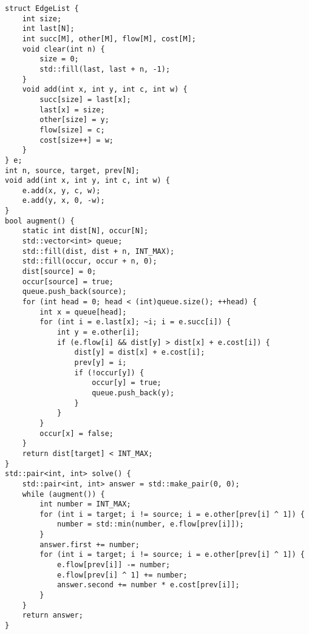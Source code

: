 \begin{lstlisting}
struct EdgeList {
    int size;
    int last[N];
    int succ[M], other[M], flow[M], cost[M];
    void clear(int n) {
        size = 0;
        std::fill(last, last + n, -1);
    }
    void add(int x, int y, int c, int w) {
        succ[size] = last[x];
        last[x] = size;
        other[size] = y;
        flow[size] = c;
        cost[size++] = w;
    }
} e;
int n, source, target, prev[N];
void add(int x, int y, int c, int w) {
    e.add(x, y, c, w);
    e.add(y, x, 0, -w);
}
bool augment() {
    static int dist[N], occur[N];
    std::vector<int> queue;
    std::fill(dist, dist + n, INT_MAX);
    std::fill(occur, occur + n, 0);
    dist[source] = 0;
    occur[source] = true;
    queue.push_back(source);
    for (int head = 0; head < (int)queue.size(); ++head) {
        int x = queue[head];
        for (int i = e.last[x]; ~i; i = e.succ[i]) {
            int y = e.other[i];
            if (e.flow[i] && dist[y] > dist[x] + e.cost[i]) {
                dist[y] = dist[x] + e.cost[i];
                prev[y] = i;
                if (!occur[y]) {
                    occur[y] = true;
                    queue.push_back(y);
                }
            }
        }
        occur[x] = false;
    }
    return dist[target] < INT_MAX;
}
std::pair<int, int> solve() {
    std::pair<int, int> answer = std::make_pair(0, 0);
    while (augment()) {
        int number = INT_MAX;
        for (int i = target; i != source; i = e.other[prev[i] ^ 1]) {
            number = std::min(number, e.flow[prev[i]]);
        }
        answer.first += number;
        for (int i = target; i != source; i = e.other[prev[i] ^ 1]) {
            e.flow[prev[i]] -= number;
            e.flow[prev[i] ^ 1] += number;
            answer.second += number * e.cost[prev[i]];
        }
    }
    return answer;
}
\end{lstlisting}
